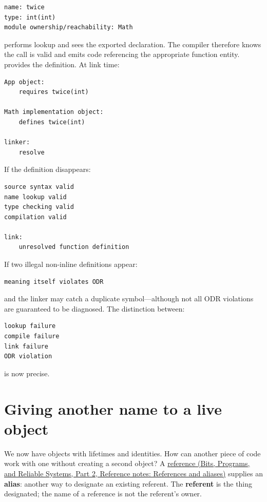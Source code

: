 \begin{verbatim}
name: twice
type: int(int)
module ownership/reachability: Math
\end{verbatim}

 performs lookup and sees the exported declaration. The compiler therefore knows the call is valid and emits code referencing the appropriate function entity.  provides the definition. At link time:

\begin{verbatim}
App object:
    requires twice(int)

Math implementation object:
    defines twice(int)

linker:
    resolve
\end{verbatim}

If the definition disappears:

\begin{verbatim}
source syntax valid
name lookup valid
type checking valid
compilation valid

link:
    unresolved function definition
\end{verbatim}

If two illegal non-inline definitions appear:

\begin{verbatim}
meaning itself violates ODR
\end{verbatim}

and the linker may catch a duplicate symbol---although not all ODR violations are guaranteed to be diagnosed. The distinction between:

\begin{verbatim}
lookup failure
compile failure
link failure
ODR violation
\end{verbatim}

is now precise.

\section{Giving another name to a live object}\label{05-engine-i-ch003-giving-another-name-to-a-live-object}

\hypertarget{05-engine-i-ch003-giving-another-name-to-a-live-object}{}

We now have objects with lifetimes and identities. How can another piece of code work with one without creating a second object? A \href{../01-Bits-Programs-and-Reliable-Systems-P02/main.pdf\#nameddest=appendix-d6d562ca9fbb}{reference (Bits, Programs, and Reliable Systems, Part 2, Reference notes: References and aliases)} supplies an \textbf{alias}: another way to designate an existing referent. The \textbf{referent} is the thing designated; the name of a reference is not the referent's owner.

